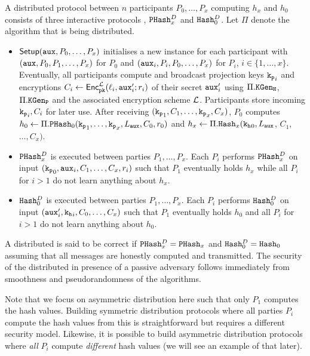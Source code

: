 A distributed \SPHFF protocol between $n$ participants $P_0,\dots,P_x$ computing $h_x$ and $h_0$ consists of three interactive protocols \Setup, $\mathtt{PHash}_x^D$ and $\mathtt{Hash}_0^D$.
Let $\Pi$ denote the \SPHFF algorithm that is being distributed.
\begin{itemize}
	\item $\mathsf{Setup}(\mathtt{aux},P_0,\dots,P_x)$ initialises a new instance for each participant with $(\mathtt{aux},P_0,P_1,\dots,P_x)$ for $P_0$ and $(\mathtt{aux}_i,P_i,P_0,\dots,P_x)$ for $P_i$, $i\in\{1,\dots,x\}$.
	Eventually, all participants compute and broadcast projection keys $\mathtt{k_p}_i$ and encryptions $C_i\gets\mathsf{Enc}_{\mathtt{pk}}^{\mathcal{L}}(\ell_i,\mathtt{aux}'_i;r_i)$ of their secret $\mathtt{aux}'_i$ using $\Pi.\mathtt{KGen_H}$, $\Pi.\mathtt{KGen_P}$ and the associated encryption scheme $\mathcal{L}$.
	Participants store incoming $\mathtt{k_p}_i,C_i$ for later use.
	After receiving $(\mathtt{k_p}_1,C_1,\dots,\mathtt{k_p}_x,C_x)$, $P_0$ computes $h_0\gets\Pi.\mathtt{PHash}_0(\mathtt{k_p}_1,\dots,\mathtt{k_p}_x,L_\mathtt{aux},C_0,r_0)$ and $h_x\gets\Pi.\mathtt{Hash}_x(\mathtt{k_h}_0,L_\mathtt{aux}$, $C_1$, $\dots,C_x)$.

	\item $\mathtt{PHash}_x^D$ is executed between parties $P_1,\dots,P_x$.
	Each $P_i$ performs $\mathtt{PHash}_x^D$ on input $(\mathtt{k_p}_0,\mathtt{aux}_i,\allowbreak C_1,\dots,C_x,r_i)$ such that $P_1$ eventually holds $h_x$ while all $P_i$ for $i>1$ do not learn anything about $h_x$.
	
	\item $\mathtt{Hash}_0^D$ is executed between parties $P_1,\dots,P_x$.
	Each $P_i$ performs $\mathtt{Hash}_0^D$ on input $(\mathtt{aux}'_i,\mathtt{k_h}_i,\allowbreak C_0,\dots,C_x)$ such that $P_1$ eventually holds $h_0$ and all $P_i$ for $i>1$ do not learn anything about $h_0$.
\end{itemize}

\noindent
A distributed \SPHFF is said to be correct if $\mathtt{PHash}_x^D=\mathtt{PHash}_x$ and $\mathtt{Hash}_0^D=\mathtt{Hash}_0$ assuming that all messages are honestly computed and transmitted.
The security of the distributed \SPHFF in presence of a passive adversary follows immediately from smoothness and pseudorandomness of the \SPHFF algorithms.

\begin{remark}
Note that we focus on asymmetric distribution here such that only $P_1$ computes the hash values.
Building symmetric distribution protocols where all parties $P_i$ compute the hash values from this is straightforward but requires a different security model.
Likewise, it is possible to build asymmetric distribution protocols where \emph{all} $P_i$ compute \emph{different} hash values (we will see an example of that later).
\end{remark}

